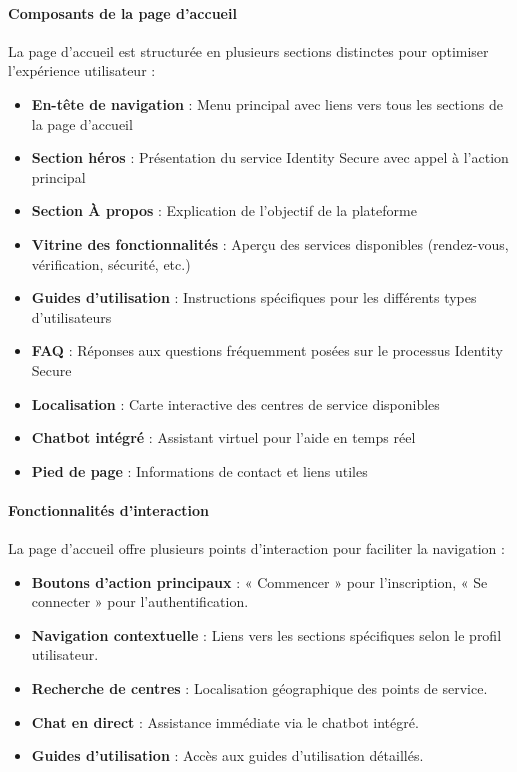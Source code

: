 \paragraph{Composants de la page d'accueil}
La page d'accueil est structurée en plusieurs sections distinctes pour optimiser l'expérience utilisateur :
\begin{itemize}
    \item \textbf{En-tête de navigation} : Menu principal avec liens vers tous les sections de la page d'accueil
    \item \textbf{Section héros} : Présentation du service Identity Secure avec appel à l'action principal
    \item \textbf{Section À propos} : Explication de l'objectif de la plateforme
    \item \textbf{Vitrine des fonctionnalités} : Aperçu des services disponibles (rendez-vous, vérification, sécurité, etc.)
    \item \textbf{Guides d'utilisation} : Instructions spécifiques pour les différents types d'utilisateurs
    \item \textbf{FAQ} : Réponses aux questions fréquemment posées sur le processus Identity Secure
    \item \textbf{Localisation} : Carte interactive des centres de service disponibles
    \item \textbf{Chatbot intégré} : Assistant virtuel pour l'aide en temps réel
    \item \textbf{Pied de page} : Informations de contact et liens utiles
\end{itemize}

\paragraph{Fonctionnalités d'interaction}
La page d'accueil offre plusieurs points d'interaction pour faciliter la navigation :
\begin{itemize}
    \item \textbf{Boutons d'action principaux} : « Commencer » pour l'inscription, « Se connecter » pour l'authentification.
    \item \textbf{Navigation contextuelle} : Liens vers les sections spécifiques selon le profil utilisateur.
    \item \textbf{Recherche de centres} : Localisation géographique des points de service.
    \item \textbf{Chat en direct} : Assistance immédiate via le chatbot intégré.
    \item \textbf{Guides d'utilisation} : Accès aux guides d'utilisation détaillés.
\end{itemize}

